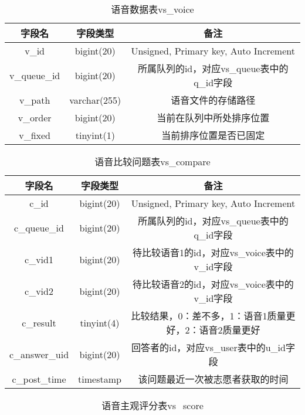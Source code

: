 \begin{table}
\centering
\caption{语音数据表vs\_voice}
\label{tab:voice}
\begin{tabular}{ccc}
\toprule[1.5pt]
字段名 & 字段类型 & 备注 \\ \midrule[1pt]
v\_id & bigint(20) & Unsigned, Primary key, Auto Increment \\
v\_queue\_id & bigint(20) & 所属队列的id，对应vs\_queue表中的q\_id字段 \\
v\_path & varchar(255) & 语音文件的存储路径 \\
v\_order & bigint(20) & 当前在队列中所处排序位置 \\
v\_fixed & tinyint(1) & 当前排序位置是否已固定 \\
\end{tabular}
\end{table}

\begin{table}
\centering
\caption{语音比较问题表vs\_compare}
\label{tab:compare}
\begin{tabular}{ccc}
\toprule[1.5pt]
字段名 & 字段类型 & 备注 \\ \midrule[1pt]
c\_id & bigint(20) & Unsigned, Primary key, Auto Increment \\
c\_queue\_id & bigint(20) & 所属队列的id，对应vs\_queue表中的q\_id字段 \\
c\_vid1 & bigint(20) & 待比较语音1的id，对应vs\_voice表中的v\_id字段 \\
c\_vid2 & bigint(20) & 待比较语音2的id，对应vs\_voice表中的v\_id字段 \\
c\_result & tinyint(4) & 比较结果，0：差不多，1：语音1质量更好，2：语音2质量更好 \\
c\_answer\_uid & bigint(20) & 回答者的id，对应vs\_user表中的u\_id字段 \\
c\_post\_time & timestamp & 该问题最近一次被志愿者获取的时间 \\ \bottomrule[1.5pt]
\end{tabular}
\end{table}

\begin{table}
\centering
\caption{语音主观评分表vs\_score}
\label{tab:score}
\begin{tabular}{ccc}
\toprule[1.5pt]
字段名 & 字段类型 & 备注 \\ \midrule[1pt]
s\_id & bigint(20) & Unsigned, Primary key, Auto Increment \\
s\_userid & bigint(20) & 评分志愿者的id，对应vs\_user表中的u\_id字段 \\
s\_queueid & bigint(20) & 所属队列的id，对应vs\_queue表中的q\_id字段 \\
s\_voiceid & bigint(20) & 评分语音的id，对应vs\_voice表中的v\_id字段 \\
s\_score & int(11) & 评分结果 \\
s\_post\_time & timestamp & 评分时间 \\ \bottomrule[1.5pt]
\end{tabular}
\end{table}


